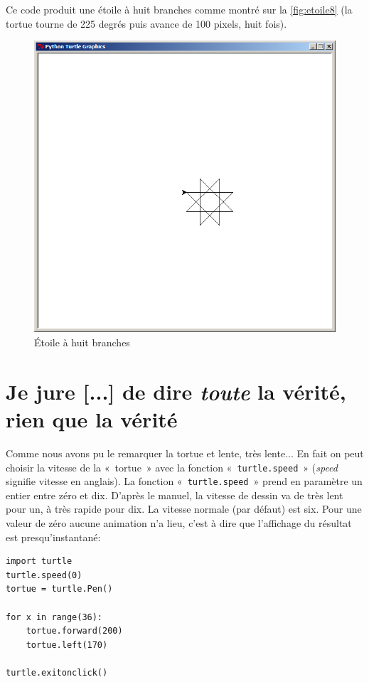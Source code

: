 Ce code produit une étoile à huit branches comme montré sur la \autoref{fig:etoile8} (la tortue tourne de 225 degrés puis avance de 100 pixels, huit fois).
\begin{figure}[h!]
\centering
\includegraphics[scale=0.4]{images/etoile8}
\caption{Étoile à huit branches}\label{fig:etoile8}
\end{figure}


\section{Je jure [...] de dire \emph{toute} la vérité, rien que la vérité}

Comme nous avons pu le remarquer la tortue et lente, très lente... En fait on peut choisir la vitesse de la «~tortue~» avec la fonction «~\texttt{turtle.speed}~» (\emph{speed} signifie vitesse en anglais). La fonction «~\texttt{turtle.speed}~» prend en paramètre un entier entre zéro et dix. D'après le manuel, la vitesse de dessin va de très lent pour un, à très rapide pour dix. La vitesse normale (par défaut) est six. Pour une valeur de zéro aucune animation n'a lieu, c'est à dire que l'affichage du résultat est presqu'instantané:

\begin{Verbatim}[frame=single,rulecolor=\color{mbleu}, label=à taper]
import turtle
turtle.speed(0)
tortue = turtle.Pen()

for x in range(36):
    tortue.forward(200)
    tortue.left(170)
    
turtle.exitonclick()
\end{Verbatim}

